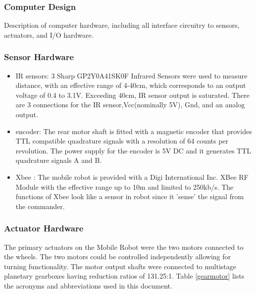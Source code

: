 \documentclass[11pt,a4paper]{article}
\begin{document}
    \subsubsection{Computer Design}
    Description of computer hardware, including all interface circuitry to sensors, actuators, and I/O hardware.
    \subsubsection{Sensor Hardware}

      \begin{itemize}
        \item IR sensors:{ 3 Sharp GP2Y0A41SK0F Infrared Sensors were used to measure distance, with an effective range of 4-40cm, which corresponds to an output voltage of 0.4 to 3.1V. Exceeding 40cm, IR sensor output is saturated. There are 3 connections for the IR sensor,Vcc(nominally 5V), Gnd, and an analog output.}
        \item encoder:{ The rear motor shaft is fitted with a magnetic encoder that provides TTL compatible quadrature signals with a resolution of 64 counts per revolution. The power supply for the encoder is 5V DC and it generates TTL quadrature signals A and B.}
        \item Xbee : {The mobile robot is provided with a Digi International Inc. XBee RF Module with the effective range up to 10m and limited to 250kb/s. The functions of Xbee look like a sensor in robot since it 'sense' the signal from the commander.}
      \end{itemize}
    \subsubsection{Actuator Hardware}
      The primary actuators on the Mobile Robot were the two motors connected to the wheels. The two motors could be  controlled independently allowing for turning functionality. The motor output shafts were connected to multistage planetary gearboxes having reduction ratios of 131.25:1.
      Table \ref{gearmotor} lists the acronyms and abbreviations used in this document.
     
\end{document}
